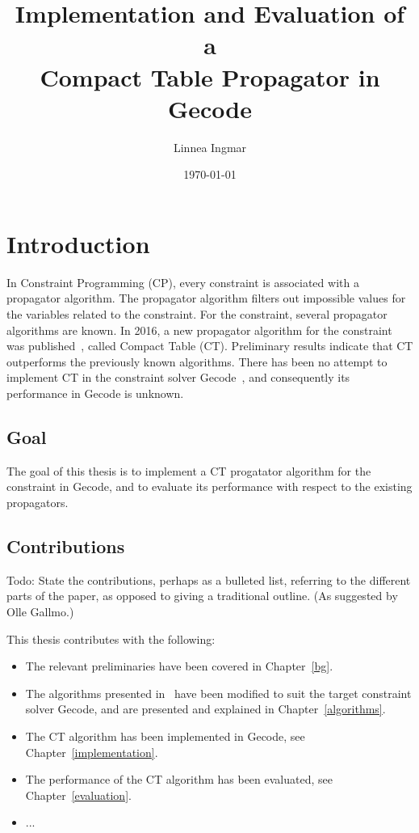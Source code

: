 \documentclass[a4paper,11pt]{article}
\title{\textbf{Implementation and Evaluation of a\\
    Compact Table Propagator in Gecode
  }
}
\author{Linnea Ingmar} %
\date{\today}
\newcommand{\Todo}[1]{{\color{blue}Todo: #1}}
\newcommand{\Chapref}[1]{Chapter~\ref{#1}}
\newcommand{\Table}{\Constraint{Table}}
\begin{document}
\maketitle

\tableofcontents

\newpage

\section{Introduction}
\label{intro}

In Constraint Programming (CP), every constraint is associated with a propagator
algorithm. The propagator algorithm filters out impossible values for the variables
related to the constraint. For the \Table constraint, several propagator
algorithms are known. In 2016, a new propagator algorithm for the \Table
constraint was published~\cite{DBLP:conf/cp/DemeulenaereHLP16}, called Compact Table (CT).
Preliminary results indicate that CT outperforms the previously known algorithms.
There has been no attempt to implement CT in the constraint solver Gecode~\cite{Gecode}, and consequently its performance in Gecode is unknown.

\subsection{Goal}
\label{intro:goal}
The goal of this thesis is to implement a CT progatator
algorithm for the \Table constraint in Gecode,
and to evaluate its performance with respect to the existing propagators.

\subsection{Contributions}
\label{intro:contributions}

\Todo{State the contributions, perhaps as a bulleted list, referring to the different
parts of the paper, as opposed to giving a traditional outline. (As suggested
by Olle Gallmo.)}

This thesis contributes with the following:

\begin{itemize}
  \item The relevant preliminaries have been covered in \Chapref{bg}.
  \item The algorithms presented in~\cite{DBLP:conf/cp/DemeulenaereHLP16} have been modified to suit the
    target constraint solver Gecode, and are presented and explained in 
    \Chapref{algorithms}.
  \item The CT algorithm has been implemented in Gecode, see \Chapref{implementation}.
  \item The performance of the CT algorithm has been evaluated, see \Chapref{evaluation}.
  \item ...
\end{itemize}
\end{document}
